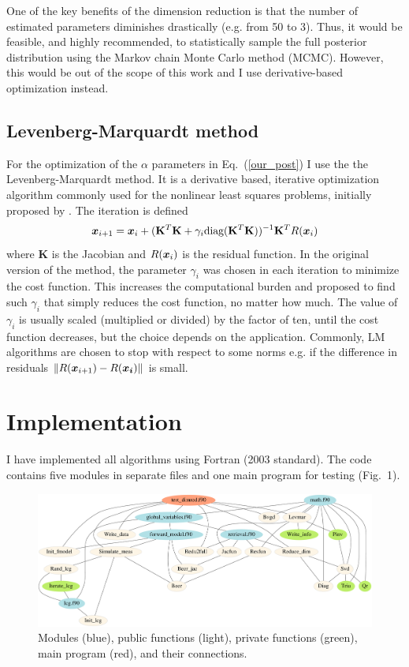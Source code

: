 \documentclass[12pt,a4paper]{article}
\newcommand*{\norm}[1]{\left\lVert#1\right\rVert}
\newcommand{\mat}[1]{\mathbf{#1}}
\DeclareRobustCommand*{\vec}[1]{\ensuremath{
\mathchoice{\mbox{\boldmath$\displaystyle#1$}}
           {\mbox{\boldmath$\textstyle#1$}}
           {\mbox{\boldmath$\scriptstyle#1$}}
           {\mbox{\boldmath$\scriptscriptstyle#1$}}}}
\begin{document}
One of the key benefits of the dimension reduction is that the number of estimated
parameters diminishes drastically (e.g. from 50 to 3). Thus, it would be feasible, 
and highly recommended, to statistically sample the full posterior distribution 
using the Markov chain Monte Carlo method (MCMC). However, this would be out of the scope
of this work and I use derivative-based optimization instead.

\subsection{Levenberg-Marquardt method}
\label{LM}

For the optimization of the $\alpha$ parameters in Eq.~(\ref{our_post}) I use the 
the Levenberg-Marquardt method. 
It is a derivative based, iterative optimization algorithm commonly used
for the nonlinear least squares problems, initially proposed by \citet{Levenberg44}. The iteration is defined
\begin{equation}
\vec{x}_{i+1} = \vec{x}_i + (\mat{K}^T\mat{K}+\gamma_i \text{diag}(\mat{K}^T\mat{K}))^{-1}\mat{K}^TR(\vec{x}_i)
\end{equation}
where $\mat{K}$ is the Jacobian and $R(\vec{x}_i)$ is the residual function.
In the original version of the method, the parameter $\gamma_i$ was chosen in each iteration to minimize
the cost function. This increases the computational burden and \citet{Marquardt63} proposed to find such $\gamma_i$
that simply reduces the cost function, no matter how much. The value of $\gamma_i$ is usually scaled (multiplied or divided) by
the factor of ten, until the cost function decreases, but the choice depends on the application.
Commonly, LM algorithms are chosen to stop with respect to some norms e.g. if 
the difference in residuals $\norm{R(\vec{x}_{i+1})-R(\vec{x_i})}$ is small.

\section{Implementation}

I have implemented all algorithms using Fortran (2003 standard). The code contains
five modules in separate files and one main program for testing (Fig.~1).
\begin{figure}[h!]
  \label{fig:vuo}
  \centering
  \includegraphics[width=1.05\textwidth]{figs/dimred_full.pdf}
  \caption{Modules (blue), public functions (light), private functions (green), main program (red), and their connections.}  
\end{figure}
\end{document}
